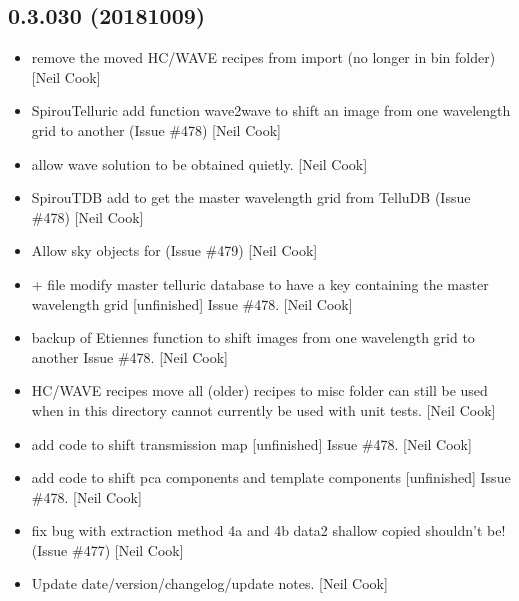 \documentclass[a4paper,10pt,english]{report}
\begin{document}
\subsection{0.3.030 (2018\sphinxhyphen{}10\sphinxhyphen{}09)}
\label{\detokenize{misc/changelog:id319}}\begin{itemize}
\item {} 
 \sphinxhyphen{} remove the moved HC/WAVE recipes from import
(no longer in bin folder) {[}Neil Cook{]}

\item {} 
SpirouTelluric \sphinxhyphen{} add function wave2wave to shift an image from one
wavelength grid to another (Issue \#478) {[}Neil Cook{]}

\item {} 
 \sphinxhyphen{} allow wave solution to be obtained quietly. {[}Neil
Cook{]}

\item {} 
SpirouTDB \sphinxhyphen{} add  to get the master wavelength
grid from TelluDB (Issue \#478) {[}Neil Cook{]}

\item {} 
 \sphinxhyphen{} Allow sky objects for  (Issue
\#479) {[}Neil Cook{]}

\item {} 
 + file \sphinxhyphen{} modify master telluric database to
have a  key \sphinxhyphen{} containing the master wavelength grid
{[}unfinished{]} \sphinxhyphen{} Issue \#478. {[}Neil Cook{]}

\item {} 
 \sphinxhyphen{} backup of Etiennes function to shift images from one
wavelength grid to another \sphinxhyphen{} Issue \#478. {[}Neil Cook{]}

\item {} 
HC/WAVE recipes \sphinxhyphen{} move all (older) recipes to misc folder \sphinxhyphen{} can still
be used when in this directory \sphinxhyphen{} cannot currently be used with unit
tests. {[}Neil Cook{]}

\item {} 
 \sphinxhyphen{} add code to shift transmission map {[}unfinished{]} \sphinxhyphen{}
Issue \#478. {[}Neil Cook{]}

\item {} 
 \sphinxhyphen{} add code to shift pca components and template
components {[}unfinished{]} \sphinxhyphen{} Issue \#478. {[}Neil Cook{]}

\item {} 
 \sphinxhyphen{} fix bug with extraction method 4a and 4b \sphinxhyphen{}
data2 shallow copied \sphinxhyphen{} shouldn’t be! (Issue \#477) {[}Neil Cook{]}

\item {} 
Update date/version/changelog/update notes. {[}Neil Cook{]}

\end{itemize}
\end{document}
